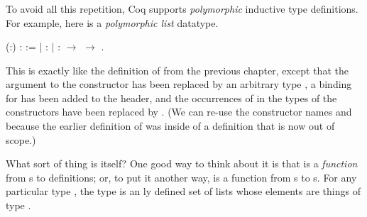 \documentclass[12pt]{report}
\begin{document}
\subsubsection{ }



 To avoid all this repetition, Coq supports \textit{polymorphic}
    inductive type definitions.  For example, here is a \textit{polymorphic
    list} datatype. \begin{coqdoccode}
\coqdocemptyline
\coqdocnoindent
{}  (:) :  :=\coqdoceol
\coqdocindent{1.00em}
\ensuremath{|}  :  \coqdoceol
\coqdocindent{1.00em}
\ensuremath{|}  :  \ensuremath{\rightarrow}   \ensuremath{\rightarrow}  .\coqdoceol
\coqdocemptyline
\end{coqdoccode}
This is exactly like the definition of  from the
    previous chapter, except that the  argument to the 
    constructor has been replaced by an arbitrary type , a binding
    for  has been added to the header, and the occurrences of
     in the types of the constructors have been replaced by
     .  (We can re-use the constructor names  and 
    because the earlier definition of  was inside of a
     definition that is now out of scope.) 

 What sort of thing is  itself?  One good way to think
    about it is that  is a \textit{function} from s to
     definitions; or, to put it another way,  is a
    function from s to s.  For any particular type ,
    the type   is an ly defined set of lists whose
    elements are things of type . 
\end{document}
